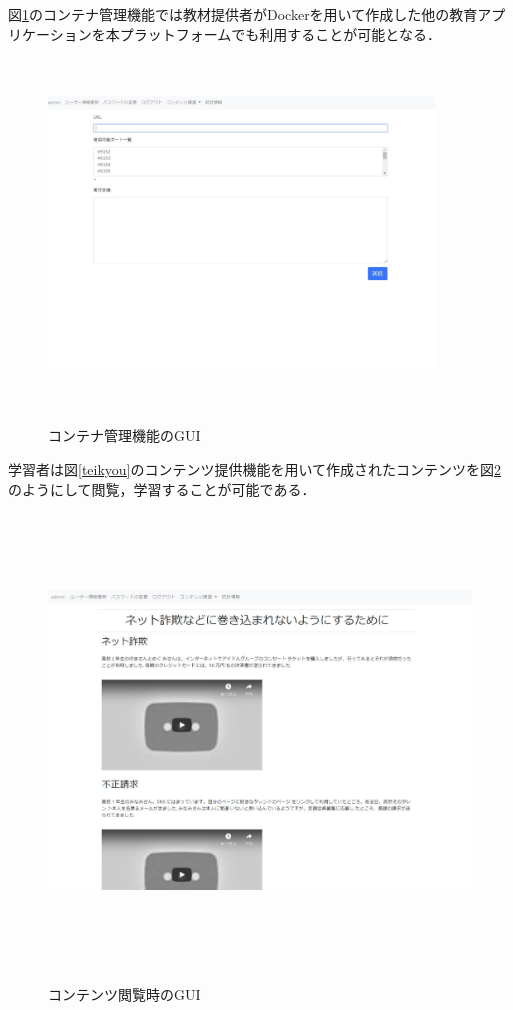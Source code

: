 図\ref{kanri}のコンテナ管理機能では教材提供者がDockerを用いて作成した他の教育アプリケーションを本プラットフォームでも利用することが可能となる．
\begin{figure}[htbp]
    \begin{center}
        \includegraphics[width=10.25cm,height=9.25cm,keepaspectratio]{container_management-crop.pdf}\\
    \end{center}
    \caption{コンテナ管理機能のGUI}
    \label{kanri}
\end{figure}

\newpage
学習者は図\ref{teikyou}のコンテンツ提供機能を用いて作成されたコンテンツを図\ref{naiyou}のようにして閲覧，学習することが可能である．
\begin{figure}[htbp]
    \begin{center}
        \includegraphics[width=13cm,height=12cm,keepaspectratio]{naiyou-crop.pdf}\\
    \end{center}
    \caption{コンテンツ閲覧時のGUI}
    \label{naiyou}
\end{figure}

